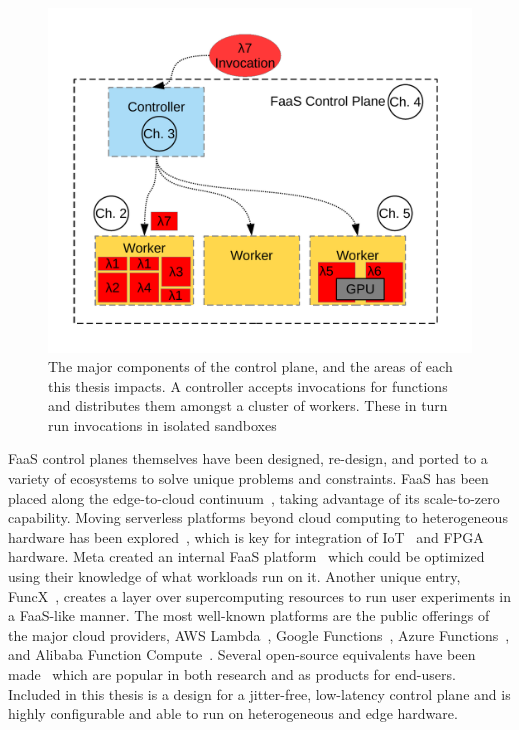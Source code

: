 \begin{figure}
  \centering
  \includegraphics[width=\textwidth]{./introduction/figs/faas-labeled.pdf}
  \caption{The major components of the control plane, and the areas of each this thesis impacts. A controller accepts invocations for functions and distributes them amongst a cluster of workers. These in turn run invocations in isolated sandboxes}
  \label{fig:control-plane}
\end{figure}

FaaS control planes themselves have been designed, re-design, and ported to a variety of ecosystems to solve unique problems and constraints.
FaaS has been placed along the edge-to-cloud continuum~\cite{cicconetti2020decentralized,russo2023serverless,cheng2019fog,wang2020supporting}, taking advantage of its scale-to-zero capability.
Moving serverless platforms beyond cloud computing to heterogeneous hardware has been explored~\cite{du2022serverless}, which is key for integration of IoT~\cite{persson2017kappa,trilles2020iot,cheng2019fog,wang2020supporting} and FPGA~\cite{bacis2020blastfunction,ringlein2021case} hardware.
Meta created an internal FaaS platform~\cite{sahraei2023xfaas} which could be optimized using their knowledge of what workloads run on it.
Another unique entry, FuncX~\cite{funcx_hpdc_20}, creates a layer over supercomputing resources to run user experiments in a FaaS-like manner.
The most well-known platforms are the public offerings of the major cloud providers, AWS Lambda~\cite{lambda}, Google Functions~\cite{gcp-functions}, Azure Functions~\cite{azure-functions}, and Alibaba Function Compute~\cite{alibaba-compute}.
Several open-source equivalents have been made~\cite{openwhisk,openfaas,nuclio,knative} which are popular in both research and as products for end-users.
Included in this thesis is a design for a jitter-free, low-latency control plane and is highly configurable and able to run on heterogeneous and edge hardware.

